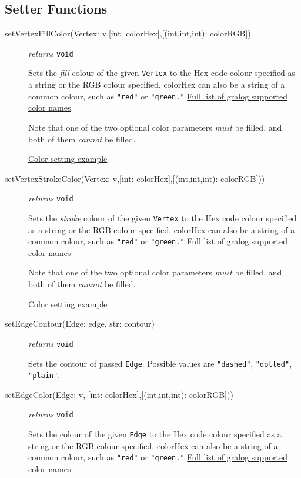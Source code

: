 \documentclass{article}
\newcounter{example}
\begin{document}
\subsection{Setter Functions}
\begin{description}
\item[setVertexFillColor(Vertex: v,{[int: colorHex]},{[(int,int,int): colorRGB]})]\emph{returns}
  \texttt{void}

Sets the \textit{fill} colour of the given \texttt{Vertex} to the Hex code colour
specified as a string or the RGB colour specified. colorHex can also be
a string of a common colour, such as \texttt{"red"} or
\texttt{"green."} \hyperref[colorNamesSupportedByGralog]{Full list of gralog supported color names}

Note that one of the two optional color parameters \textit{must} be filled, and both of them \textit{cannot} be filled.

\hyperref[colorNamesSupportedByGralog]{Color setting example}

\item[setVertexStrokeColor(Vertex: v,{[int: colorHex]},{[(int,int,int): colorRGB]}))] \emph{returns} \texttt{void}

Sets the \textit{stroke} colour of the given \texttt{Vertex} to the Hex code colour
specified as a string or the RGB colour specified. colorHex can also be
a string of a common colour, such as \texttt{"red"} or
\texttt{"green."} \hyperref[colorNamesSupportedByGralog]{Full list of gralog supported color names}

Note that one of the two optional color parameters \textit{must} be filled, and both of them \textit{cannot} be filled.

\hyperref[colorNamesSupportedByGralog]{Color setting example}

\item[setEdgeContour(Edge: edge, str: contour)] \emph{returns}
\texttt{void}

Sets the contour of passed \texttt{Edge}. Possible values are
\texttt{"dashed"}, \texttt{"dotted"}, \texttt{"plain"}.

\item[setEdgeColor(Edge: v, {[int: colorHex]},{[(int,int,int): colorRGB]}))] \emph{returns} \texttt{void}

Sets the colour of the given \texttt{Edge} to the Hex code colour
specified as a string or the RGB colour specified. colorHex can also be
a string of a common colour, such as \texttt{"red"} or
\texttt{"green."} \hyperref[colorNamesSupportedByGralog]{Full list of gralog supported color names}


\end{description}
\end{document}
